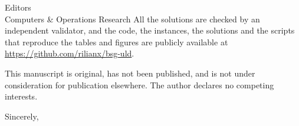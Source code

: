 \documentclass[11pt]{letter}
\begin{document}
\begin{letter}{Editors\\Computers \& Operations Research}
All the solutions are checked by an independent validator, and the code, the instances, the
solutions and the scripts that reproduce the tables and figures are publicly available at
\url{https://github.com/rilianx/bsg-uld}.

This manuscript is original, has not been published, and is not under consideration for
publication elsewhere. The author declares no competing interests.

\closing{Sincerely,}

\end{letter}
\end{document}
